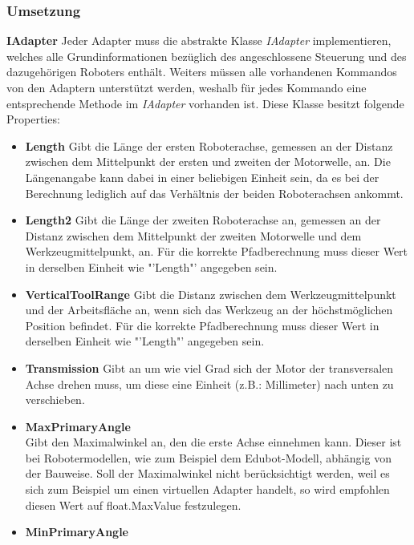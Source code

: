 \subsubsection{Umsetzung}
\textbf{IAdapter}
\newline
Jeder Adapter muss die abstrakte Klasse \textit{IAdapter} implementieren, welches alle Grundinformationen bezüglich des angeschlossene Steuerung und des dazugehörigen Roboters enthält. Weiters müssen alle vorhandenen Kommandos von den Adaptern unterstützt werden, weshalb für jedes Kommando eine entsprechende Methode im \textit{IAdapter} vorhanden ist. Diese Klasse besitzt folgende Properties:
\begin{itemize}
\item \textbf{Length}
\newline
Gibt die Länge der ersten Roboterachse, gemessen an der Distanz zwischen dem Mittelpunkt der ersten und zweiten der Motorwelle, an. Die Längenangabe kann dabei in einer beliebigen Einheit sein, da es bei der Berechnung lediglich auf das Verhältnis der beiden Roboterachsen ankommt.
\item \textbf{Length2}
\newline
Gibt die Länge der zweiten Roboterachse an, gemessen an der Distanz zwischen dem Mittelpunkt der zweiten Motorwelle und dem Werkzeugmittelpunkt, an. Für die korrekte Pfadberechnung muss dieser Wert in derselben Einheit wie "'Length"' angegeben sein.
\item \textbf{VerticalToolRange}
\newline
Gibt die Distanz zwischen dem Werkzeugmittelpunkt und der Arbeitsfläche an, wenn sich das Werkzeug an der höchstmöglichen Position befindet. Für die korrekte Pfadberechnung muss dieser Wert in derselben Einheit wie "'Length"' angegeben sein.
\item \textbf{Transmission}
\newline
Gibt an um wie viel Grad sich der Motor der transversalen Achse drehen muss, um diese eine Einheit (z.B.: Millimeter) nach unten zu verschieben.
\item \textbf{MaxPrimaryAngle}\\
Gibt den Maximalwinkel an, den die erste Achse einnehmen kann. Dieser ist bei Robotermodellen, wie zum Beispiel dem Edubot-Modell, abhängig von der Bauweise. Soll der Maximalwinkel nicht berücksichtigt werden, weil es sich zum Beispiel um einen virtuellen Adapter handelt, so wird empfohlen diesen Wert auf float.MaxValue festzulegen.
\item \textbf{MinPrimaryAngle}\\

\end{itemize}
